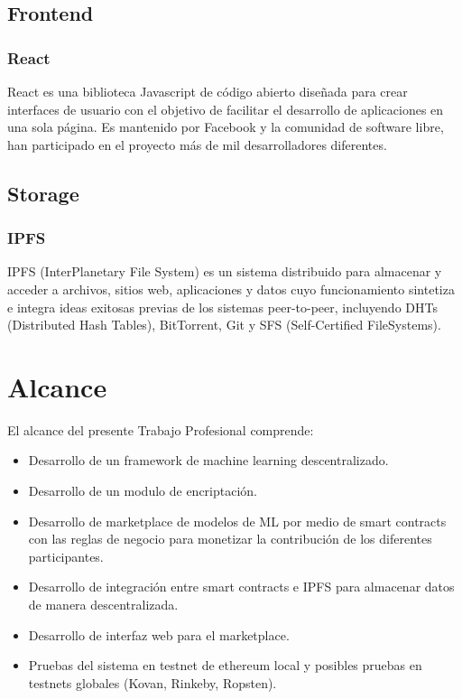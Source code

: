 \documentclass[
11pt, %
oneside, %
spanish, %
singlespacing, %
headsepline, %
chapterinoneline, %
]{MastersDoctoralThesis} %
\begin{document}
\section{Frontend}

\subsection{React \cite{rt}}
React es una biblioteca Javascript de código abierto diseñada para crear interfaces de usuario con el objetivo de facilitar el desarrollo de aplicaciones en una sola página. Es mantenido por Facebook y la comunidad de software libre, han participado en el proyecto más de mil desarrolladores diferentes.

\section{Storage}

\subsection{IPFS \cite{ipfs}}
IPFS (InterPlanetary File System) es un sistema distribuido para almacenar y acceder a archivos, sitios web, aplicaciones y datos cuyo funcionamiento sintetiza e integra ideas exitosas previas de los sistemas peer-to-peer, incluyendo DHTs (Distributed Hash Tables),  BitTorrent, Git y SFS (Self-Certified FileSystems).

\chapter{Alcance}
El alcance del presente Trabajo Profesional comprende:

\begin{itemize}
\item Desarrollo de un framework de machine learning descentralizado.
\item Desarrollo de un modulo de encriptación.
\item Desarrollo de marketplace de modelos de ML por medio de smart contracts con las reglas de negocio para monetizar la contribución de los diferentes participantes.
\item Desarrollo de integración entre smart contracts e IPFS para almacenar datos de manera descentralizada.
\item Desarrollo de interfaz web para el marketplace.
\item Pruebas del sistema en testnet de ethereum local y posibles pruebas en testnets globales (Kovan, Rinkeby, Ropsten).
\end{itemize}
\end{document}

